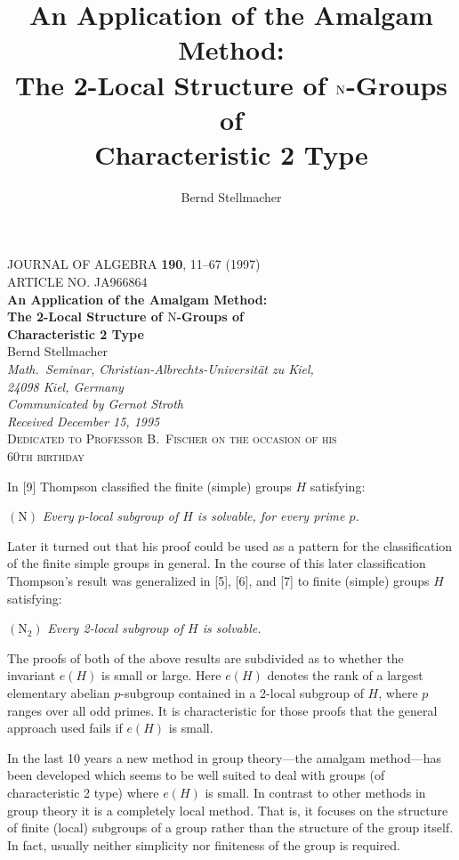 \documentclass[11pt]{article}
\title{\bfseries An Application of the Amalgam Method:\\[2pt]
  The 2-Local Structure of $\N$-Groups of\\[2pt]
  Characteristic 2 Type}
\author{Bernd Stellmacher}
\date{}
\theoremstyle{plain}
\theoremstyle{stmplain}
\newcommand{\N}{\mathrm{N}}
\begin{document}
\begin{center}
{\footnotesize JOURNAL OF ALGEBRA \textbf{190}, 11--67 (1997)}\\[2pt]
{\footnotesize ARTICLE NO. JA966864}\\[6pt]
{\Large\bfseries An Application of the Amalgam Method:\\
The 2-Local Structure of $\N$-Groups of\\
Characteristic 2 Type}\\[8pt]
{\large Bernd Stellmacher}\\[4pt]
{\itshape Math.\ Seminar, Christian-Albrechts-Universit\"at zu Kiel,\\
24098 Kiel, Germany}\\[6pt]
{\itshape Communicated by Gernot Stroth}\\[4pt]
{\itshape Received December 15, 1995}\\[10pt]
{\scshape Dedicated to Professor B.\ Fischer on the occasion of his\\
60th birthday}
\end{center}

\setcounter{section}{0}

\noindent In [9] Thompson classified the finite (simple) groups $H$ satisfying:

\medskip
\noindent $(\N)$ \quad \textit{Every $p$-local subgroup of $H$ is solvable, for every prime $p$.}

\medskip
\noindent Later it turned out that his proof could be used as a pattern for the
classification of the finite simple groups in general. In the course of this
later classification Thompson's result was generalized in [5], [6], and [7] to
finite (simple) groups $H$ satisfying:

\medskip
\noindent $(\N_2)$ \quad \textit{Every 2-local subgroup of $H$ is solvable.}

\medskip
\noindent The proofs of both of the above results are subdivided as to whether
the invariant $e(H)$ is small or large. Here $e(H)$ denotes the rank of a
largest elementary abelian $p$-subgroup contained in a 2-local subgroup of
$H$, where $p$ ranges over all odd primes. It is characteristic for those
proofs that the general approach used fails if $e(H)$ is small.

\noindent In the last 10 years a new method in group theory---the amalgam
method---has been developed which seems to be well suited to deal with groups
(of characteristic 2 type) where $e(H)$ is small. In contrast to other methods
in group theory it is a completely local method. That is, it focuses on the
structure of finite (local) subgroups of a group rather than the structure of
the group itself. In fact, usually neither simplicity nor finiteness of the
group is required.
\end{document}
